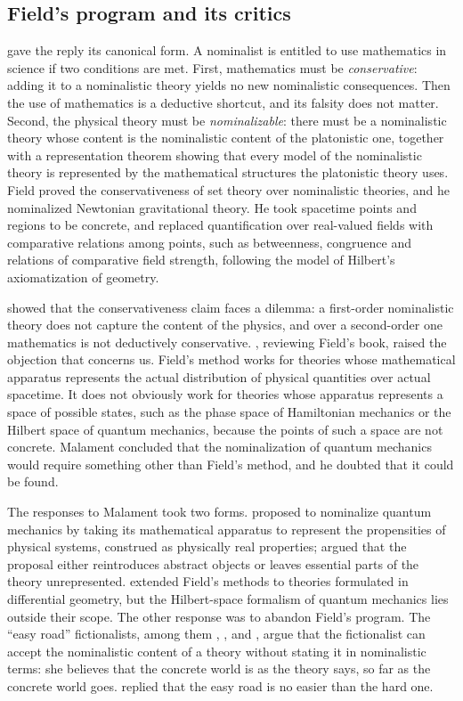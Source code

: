 \documentclass{situationist-preprint}
\begin{document}
\subsection{Field's program and its critics}

\citet{Field1980} gave the reply its canonical form. A nominalist is entitled to use mathematics in science if two conditions are met. First, mathematics must be \emph{conservative}: adding it to a nominalistic theory yields no new nominalistic consequences. Then the use of mathematics is a deductive shortcut, and its falsity does not matter. Second, the physical theory must be \emph{nominalizable}: there must be a nominalistic theory whose content is the nominalistic content of the platonistic one, together with a representation theorem showing that every model of the nominalistic theory is represented by the mathematical structures the platonistic theory uses. Field proved the conservativeness of set theory over nominalistic theories, and he nominalized Newtonian gravitational theory. He took spacetime points and regions to be concrete, and replaced quantification over real-valued fields with comparative relations among points, such as betweenness, congruence and relations of comparative field strength, following the model of Hilbert's axiomatization of geometry.

\citet{Shapiro1983} showed that the conservativeness claim faces a dilemma: a first-order nominalistic theory does not capture the content of the physics, and over a second-order one mathematics is not deductively conservative. \citet{Malament1982}, reviewing Field's book, raised the objection that concerns us. Field's method works for theories whose mathematical apparatus represents the actual distribution of physical quantities over actual spacetime. It does not obviously work for theories whose apparatus represents a space of possible states, such as the phase space of Hamiltonian mechanics or the Hilbert space of quantum mechanics, because the points of such a space are not concrete. Malament concluded that the nominalization of quantum mechanics would require something other than Field's method, and he doubted that it could be found.

The responses to Malament took two forms. \citet{Balaguer1996} proposed to nominalize quantum mechanics by taking its mathematical apparatus to represent the propensities of physical systems, construed as physically real properties; \citet{Bueno2003} argued that the proposal either reintroduces abstract objects or leaves essential parts of the theory unrepresented. \citet{ArntzeniusDorr2012} extended Field's methods to theories formulated in differential geometry, but the Hilbert-space formalism of quantum mechanics lies outside their scope. The other response was to abandon Field's program. The \enquote{easy road} fictionalists, among them \citet{Melia2000}, \citet{Yablo2005}, \citet{Balaguer1998} and \citet{Leng2010}, argue that the fictionalist can accept the nominalistic content of a theory without stating it in nominalistic terms: she believes that the concrete world is as the theory says, so far as the concrete world goes. \citet{Colyvan2010} replied that the easy road is no easier than the hard one.
\end{document}
